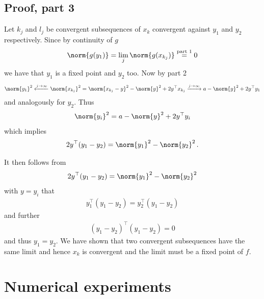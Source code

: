 \subsection{Proof, part 3}

\begin{frame}
	\begin{proofs}
	Let $k_j$ and $l_j$ be convergent subsequences of $x_k$ convergent against $y_1$ and $y_2$ respectively. Since by continuity of $g$
	\begin{align*}
		\norm{g(y_1)}=\lim_j\norm{g(x_{k_j})}\stackrel{\text{part 1}}{=}0
	\end{align*}
	we have that $y_1$ is a fixed point and $y_2$ too.
	Now by part 2
	\begin{align*}
		\norm{y_1}^2
		\xleftarrow{j\to\infty} \norm{x_{k_j}}^2
		= \norm{x_{k_j}-y}^2-\norm{y}^2+2y^\top x_{k_j}
		\xrightarrow{j\to\infty} a-\norm{y}^2+2y^\top y_1
	\end{align*}
	and analogously for $y_2$. Thus
	\begin{align*}
		\norm{y_i}^2=a-\norm{y}^2+2y^\top y_i
	\end{align*}
	which implies
	\begin{align*}
		2y^\top(y_1-y_2) = \norm{y_1}^2-\norm{y_2}^2\,.
	\end{align*}
	\end{proofs}
\end{frame}


\begin{frame}
	\begin{proofs}
	It then follows from 
	\begin{align*}
		2y^\top(y_1-y_2) = \norm{y_1}^2-\norm{y_2}^2
	\end{align*}
	with $y=y_i$ that
	\begin{align*}
		y_1^\top(y_1-y_2) = y_2^\top(y_1-y_2)
	\end{align*}
	and further
	\begin{align*}
		(y_1-y_2)^\top(y_1-y_2) = 0
	\end{align*}
	and thus $y_1=y_2$. We have shown that two convergent subsequences have the same limit and hence $x_k$ is convergent and the limit must be a fixed point of $f$.
	\end{proofs}
\end{frame}


\section{Numerical experiments}


